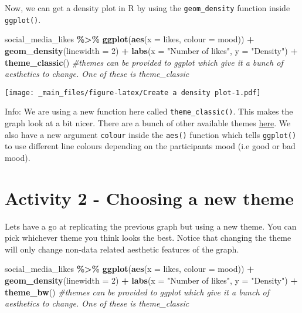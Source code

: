 \documentclass[
]{book}
\newenvironment{Shaded}{\begin{snugshade}}{\end{snugshade}}
\newcommand{\AttributeTok}[1]{\textcolor[rgb]{0.13,0.29,0.53}{#1}}
\newcommand{\CommentTok}[1]{\textcolor[rgb]{0.56,0.35,0.01}{\textit{#1}}}
\newcommand{\DecValTok}[1]{\textcolor[rgb]{0.00,0.00,0.81}{#1}}
\newcommand{\FunctionTok}[1]{\textcolor[rgb]{0.13,0.29,0.53}{\textbf{#1}}}
\newcommand{\NormalTok}[1]{#1}
\newcommand{\SpecialCharTok}[1]{\textcolor[rgb]{0.81,0.36,0.00}{\textbf{#1}}}
\newcommand{\StringTok}[1]{\textcolor[rgb]{0.31,0.60,0.02}{#1}}
\begin{document}
Now, we can get a density plot in R by using the \texttt{geom\_density} function inside \texttt{ggplot()}.

\begin{Shaded}
\begin{Highlighting}[]
\NormalTok{social\_media\_likes }\SpecialCharTok{\%\textgreater{}\%} 
\FunctionTok{ggplot}\NormalTok{(}\FunctionTok{aes}\NormalTok{(}\AttributeTok{x =}\NormalTok{ likes, }\AttributeTok{colour =}\NormalTok{ mood)) }\SpecialCharTok{+}
  \FunctionTok{geom\_density}\NormalTok{(}\AttributeTok{linewidth =} \DecValTok{2}\NormalTok{) }\SpecialCharTok{+}
    \FunctionTok{labs}\NormalTok{(}\AttributeTok{x =} \StringTok{"Number of likes"}\NormalTok{, }\AttributeTok{y =} \StringTok{"Density"}\NormalTok{) }\SpecialCharTok{+}
  \FunctionTok{theme\_classic}\NormalTok{() }\CommentTok{\#themes can be provided to ggplot which give it a bunch of aesthetics to change. One of these is theme\_classic}
\end{Highlighting}
\end{Shaded}

\texttt{[image: \_main\_files/figure-latex/Create a density plot-1.pdf]}

Info: We are using a new function here called \texttt{theme\_classic()}. This makes the graph look at a bit nicer. There are a bunch of other available themes \href{https://ggplot2.tidyverse.org/reference/ggtheme.html}{here}. We also have a new argument \texttt{colour} inside the \texttt{aes()} function which tells \texttt{ggplot()} to use different line colours depending on the participants mood (i.e good or bad mood).

\section{Activity 2 - Choosing a new theme}\label{activity-2---choosing-a-new-theme}

Lets have a go at replicating the previous graph but using a new theme. You can pick whichever theme you think looks the best. Notice that changing the theme will only change non-data related aesthetic features of the graph.

\begin{Shaded}
\begin{Highlighting}[]
\NormalTok{social\_media\_likes }\SpecialCharTok{\%\textgreater{}\%} 
\FunctionTok{ggplot}\NormalTok{(}\FunctionTok{aes}\NormalTok{(}\AttributeTok{x =}\NormalTok{ likes, }\AttributeTok{colour =}\NormalTok{ mood)) }\SpecialCharTok{+}
  \FunctionTok{geom\_density}\NormalTok{(}\AttributeTok{linewidth =} \DecValTok{2}\NormalTok{) }\SpecialCharTok{+}
    \FunctionTok{labs}\NormalTok{(}\AttributeTok{x =} \StringTok{"Number of likes"}\NormalTok{, }\AttributeTok{y =} \StringTok{"Density"}\NormalTok{) }\SpecialCharTok{+}
  \FunctionTok{theme\_bw}\NormalTok{() }\CommentTok{\#themes can be provided to ggplot which give it a bunch of aesthetics to change. One of these is theme\_classic}
\end{Highlighting}
\end{Shaded}
\end{document}
